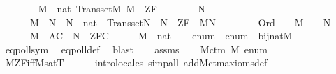 \begin{isabellebody}
\ \ \ \isanewline
\ \ \ \ {\isachardoublequoteopen}M\ {\isasymapprox}\ nat{\isachardoublequoteclose}\ {\isachardoublequoteopen}Transset{\isacharparenleft}{\kern0pt}M{\isacharparenright}{\kern0pt}{\isachardoublequoteclose}\ {\isachardoublequoteopen}M\ {\isasymTurnstile}\ ZF{\isachardoublequoteclose}\isanewline
\ \ \ \isanewline
\ \ \ \ {\isachardoublequoteopen}{\isasymexists}N{\isachardot}{\kern0pt}\ \isanewline
\ \ \ \ \ \ M\ {\isasymsubseteq}\ N\ {\isasymand}\ N\ {\isasymapprox}\ nat\ {\isasymand}\ Transset{\isacharparenleft}{\kern0pt}N{\isacharparenright}{\kern0pt}\ {\isasymand}\ N\ {\isasymTurnstile}\ ZF\ {\isasymand}\ M{\isasymnoteq}N\ {\isasymand}\isanewline
\ \ \ \ \ \ {\isacharparenleft}{\kern0pt}{\isasymforall}{\isasymalpha}{\isachardot}{\kern0pt}\ Ord{\isacharparenleft}{\kern0pt}{\isasymalpha}{\isacharparenright}{\kern0pt}\ {\isasymlongrightarrow}\ {\isacharparenleft}{\kern0pt}{\isasymalpha}\ {\isasymin}\ M\ {\isasymlongleftrightarrow}\ {\isasymalpha}\ {\isasymin}\ N{\isacharparenright}{\kern0pt}{\isacharparenright}{\kern0pt}\ {\isasymand}\isanewline
\ \ \ \ \ \ {\isacharparenleft}{\kern0pt}M{\isacharcomma}{\kern0pt}\ {\isacharbrackleft}{\kern0pt}{\isacharbrackright}{\kern0pt}{\isasymTurnstile}\ AC\ {\isasymlongrightarrow}\ N\ {\isasymTurnstile}\ ZFC{\isacharparenright}{\kern0pt}{\isachardoublequoteclose}\isanewline
%
\isadelimproof
%
\endisadelimproof
%
\isatagproof
{}\isamarkupfalse%
\ {\isacharminus}{\kern0pt}\isanewline
\ \ \isamarkupfalse%
\ {\isacartoucheopen}M\ {\isasymapprox}\ nat{\isacartoucheclose}\isanewline
\ \ \isamarkupfalse%
\ enum\ \ {\isachardoublequoteopen}enum\ {\isasymin}\ bij{\isacharparenleft}{\kern0pt}nat{\isacharcomma}{\kern0pt}M{\isacharparenright}{\kern0pt}{\isachardoublequoteclose}\isanewline
\ \ \ \ \isamarkupfalse%
\ eqpoll{\isacharunderscore}{\kern0pt}sym\ \isamarkupfalse%
\ eqpoll{\isacharunderscore}{\kern0pt}def\ \isamarkupfalse%
\ blast\isanewline
\ \ \isamarkupfalse%
\ assms\isanewline
\ \ \isamarkupfalse%
\ M{\isacharunderscore}{\kern0pt}ctm\ M\ enum\isanewline
\ \ \ \ \isamarkupfalse%
\ M{\isacharunderscore}{\kern0pt}ZF{\isacharunderscore}{\kern0pt}iff{\isacharunderscore}{\kern0pt}M{\isacharunderscore}{\kern0pt}satT\isanewline
\ \ \ \ \isamarkupfalse%
\ intro{\isacharunderscore}{\kern0pt}locales\ {\isacharparenleft}{\kern0pt}simp{\isacharunderscore}{\kern0pt}all\ add{\isacharcolon}{\kern0pt}M{\isacharunderscore}{\kern0pt}ctm{\isacharunderscore}{\kern0pt}axioms{\isacharunderscore}{\kern0pt}def{\isacharparenright}{\kern0pt}\isanewline

\end{isabellebody}
